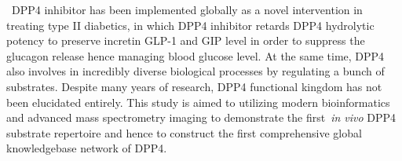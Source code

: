\ DPP4 inhibitor has been implemented globally as a novel intervention in treating type II diabetics, in which DPP4 inhibitor retards DPP4 hydrolytic potency to preserve incretin GLP-1 and GIP level in order to suppress the glucagon release hence managing blood glucose level. At the same time, DPP4 also involves in incredibly diverse biological processes by regulating a bunch of substrates. Despite many years of research, DPP4 functional kingdom has not been elucidated entirely. This study is aimed to utilizing modern bioinformatics and advanced mass spectrometry imaging to demonstrate the first~\textit{in vivo}  DPP4 substrate repertoire and hence to construct the first comprehensive global knowledgebase network of DPP4. \\